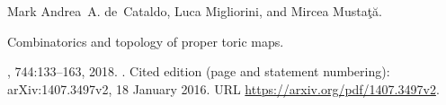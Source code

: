 Mark Andrea~A. de~Cataldo, Luca Migliorini, and Mircea Musta\c{t}\u{a}.

\newblock Combinatorics and topology of proper toric maps.

, 744:133--163, 2018.
\newblock {}.
\newblock Cited edition (page and statement numbering): arXiv:1407.3497v2, 18 January 2016.
\newblock URL \url{https://arxiv.org/pdf/1407.3497v2}.

